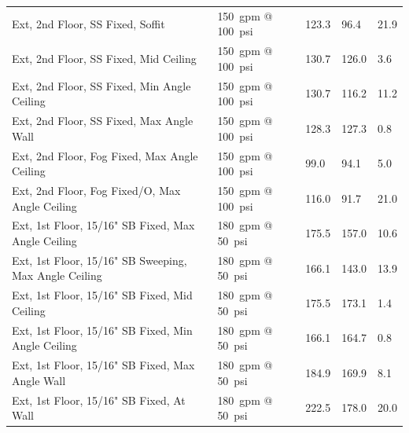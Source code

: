 \documentclass[12pt,oneside]{book}
\begin{document}
\begin{table}[!ht]
\begin{tabular}{lllll}
Ext, 2nd Floor, SS Fixed, Soffit                      & 150~gpm @ 100~psi              & 123.3                             & 96.4                               & 21.9                   \\
Ext, 2nd Floor, SS Fixed, Mid Ceiling                 & 150~gpm @ 100~psi              & 130.7                             & 126.0                              & 3.6                    \\
Ext, 2nd Floor, SS Fixed, Min Angle Ceiling           & 150~gpm @ 100~psi              & 130.7                             & 116.2                              & 11.2                   \\
Ext, 2nd Floor, SS Fixed, Max Angle Wall              & 150~gpm @ 100~psi              & 128.3                             & 127.3                              & 0.8                    \\
Ext, 2nd Floor, Fog Fixed, Max Angle Ceiling          & 150~gpm @ 100~psi              &  99.0                             & 94.1                               & 5.0                    \\
Ext, 2nd Floor, Fog Fixed/O, Max Angle Ceiling        & 150~gpm @ 100~psi              & 116.0                             & 91.7                               & 21.0                   \\
Ext, 1st Floor, 15/16" SB Fixed, Max Angle Ceiling    & 180~gpm @ 50~psi               & 175.5                             & 157.0                              & 10.6                   \\
Ext, 1st Floor, 15/16" SB Sweeping, Max Angle Ceiling & 180~gpm @ 50~psi               & 166.1                             & 143.0                              & 13.9                   \\
Ext, 1st Floor, 15/16" SB Fixed, Mid Ceiling          & 180~gpm @ 50~psi               & 175.5                             & 173.1                              & 1.4                    \\
Ext, 1st Floor, 15/16" SB Fixed, Min Angle Ceiling    & 180~gpm @ 50~psi               & 166.1                             & 164.7                              & 0.8                    \\
Ext, 1st Floor, 15/16" SB Fixed, Max Angle Wall       & 180~gpm @ 50~psi               & 184.9                             & 169.9                              & 8.1                    \\
Ext, 1st Floor, 15/16" SB Fixed, At Wall              & 180~gpm @ 50~psi               & 222.5                             & 178.0                              & 20.0                   \\

\end{tabular}
\end{table}
\end{document}

